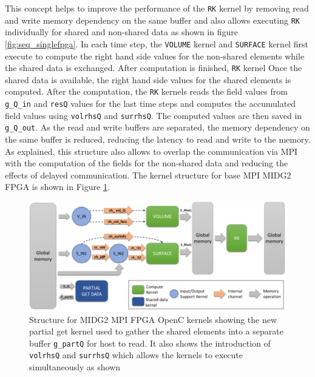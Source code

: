 This concept helps to improve the performance of the \texttt{RK} kernel
by removing read and write memory dependency on the same buffer and also allows executing
\texttt{RK} individually for shared and non-shared data as shown in figure \ref{fig:seq_singlefpga}.
In each time step, the \texttt{VOLUME} kernel and \texttt{SURFACE} kernel first execute to compute the right hand side values for the
non-shared elements while the shared data is exchanged. After computation is finished, \texttt{RK} kernel Once the shared data is available,
the right hand side values for the shared elements is computed. After the computation,
the \texttt{RK} kernels reads the field values from \texttt{g\_Q\_in} and \texttt{resQ} values
for the last time steps and computes the accumulated field values using
\texttt{volrhsQ} and \texttt{surrhsQ}. The computed values are then saved in \texttt{g\_Q\_out}.
As the read and write buffers are separated, the memory dependency on the same buffer is reduced,
reducing the latency to read and write to the memory. As explained, this structure also allows
to overlap the communication via MPI with the computation of the fields for the non-shared data
and reducing the effects of delayed communication. The kernel structure for base MPI MIDG2 FPGA
is shown in Figure \ref{fig:base_kernstruc}.
\begin{figure}[]%
    \centering
    \includegraphics[width=1.0\textwidth]{images/base_kernstruc}
    \caption{Structure for MIDG2 MPI FPGA OpenC kernels showing the new partial get kernel used to gather
     the shared elements into a separate buffer \texttt{g\_partQ} for host to read. It also shows the introduction
     of \texttt{volrhsQ} and \texttt{surrhsQ} which allows the kernels to execute simultaneously as shown}
    \label{fig:base_kernstruc}
\end{figure}